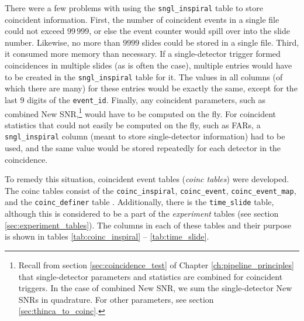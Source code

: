 There were a few problems with using the \texttt{sngl\_inspiral} table to store
coincident information. First, the number of coincident events in a single file
could not exceed $99\,999$, or else the event counter would spill over into the
slide number. Likewise, no more than $9999$ slides could be stored in a single
file. Third, it consumed more memory than necessary. If a single-detector
trigger formed coincidences in multiple slides (as is often the case), multiple
entries would have to be created in the \texttt{sngl\_inspiral} table for it.
The values in all columns (of which there are many) for these entries would be
exactly the same, except for the last 9 digits of the \texttt{event\_id}.
Finally, any coincident parameters, such as combined New
\ac{SNR},\footnote{Recall from section \ref{sec:coincidence_test} of Chapter
\ref{ch:pipeline_principles} that single-detector parameters and statistics are
combined for coincident triggers. In the case of combined New \ac{SNR}, we sum
the single-detector New \acp{SNR} in quadrature. For other parameters, see
section \ref{sec:thinca_to_coinc}.} would have to be computed on the fly. For
coincident statistics that could not easily be computed on the fly, such as
\acp{FAR}, a \texttt{sngl\_inspiral} column (meant to store single-detector
information) had to be used, and the same value would be stored repeatedly for
each detector in the coincidence.

To remedy this situation, coincident event tables (\emph{coinc tables}) were
developed. The coinc tables consist of the \texttt{coinc\_inspiral},
\texttt{coinc\_event}, \texttt{coinc\_event\_map}, and the
\texttt{coinc\_definer} table \cite{Cannon:CoincTables}. Additionally, there is
the \texttt{time\_slide} table, although this is considered to be a part of the
\emph{experiment} tables (see section \ref{sec:experiment_tables}). The columns
in each of these tables and their purpose is shown in tables
\ref{tab:coinc_inspiral} -- \ref{tab:time_slide}.

